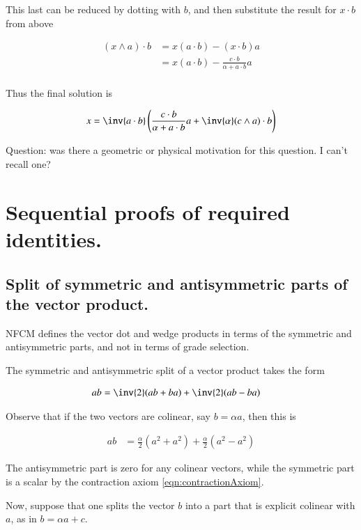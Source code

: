 \documentclass{article}
\begin{document}
This last can be reduced by dotting with $b$, and then substitute the 
result for $x \cdot b$ from above

\begin{align*}
(x \wedge a) \cdot b
&= x (a \cdot b) - (x \cdot b) a \\
&= x (a \cdot b) - \frac{c \cdot b}{\alpha + a \cdot b} a \\
\end{align*}

Thus the final solution is

\begin{align*}
x = \inv{a \cdot b}\left(
\frac{c \cdot b}{\alpha + a \cdot b} a 
+ \inv{\alpha} (c \wedge a) \cdot b
\right)
\end{align*}

Question: was there a geometric or physical motivation for this question.  I can't recall one?

\section{ Sequential proofs of required identities. }

\subsection{ Split of symmetric and antisymmetric parts of the vector product. }

NFCM defines the vector dot and wedge products in terms of the symmetric and antisymmetric parts, and not in terms of grade
selection.

The symmetric and antisymmetric split of a vector product takes the form

\begin{align*}
a b &= \inv{2}(a b + b a) + \inv{2}(a b - b a)
\end{align*}

Observe that if the two vectors are colinear, say $b = \alpha a$, then this is

\begin{align*}
a b &= \frac{\alpha}{2} (a^2 + a^2) + \frac{\alpha}{2}(a^2 - a^2 )
\end{align*}

The antisymmetric part is zero for any colinear vectors, while the symmetric part is a scalar by the contraction axiom \ref{eqn:contractionAxiom}.

Now, suppose that one splits the vector $b$ into a part that is explicit
colinear with $a$, as in $b = \alpha a + c$.
\end{document}
